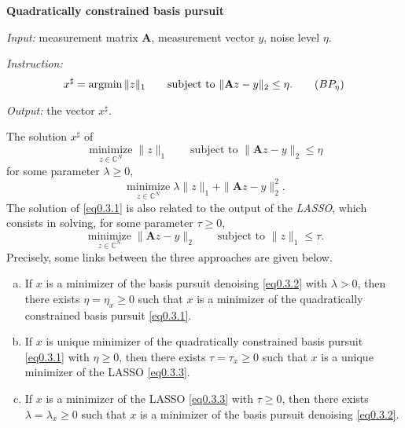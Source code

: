 \begin{mdframed}
    \label{qbp}
    \begin{center}
        \textbf{\textcolor[rgb]{1,0,0}{Quadratically constrained basis pursuit}}
    \end{center}
    \emph{Input:} measurement matrix $\mathbf{A}$, measurement vector $y$, noise level $\eta$.

    \emph{Instruction:}
    \begin{equation}
        x^{\sharp} = \mathop{\mathrm{argmin}} \|z\|_1 \qquad \text{subject to } \|\mathbf{A}z - y\|_2 \leq \eta. \tag{$BP_{\eta}$}
        \label{eqbpn}
    \end{equation}

    \emph{Output:} the vector  $x^{\sharp}$.
\end{mdframed}
    The solution $x^{\sharp}$ of 
    \begin{equation}
        \mathop{\mathrm{minimize}}\limits_{z \in \mathbb{C}^{N}}\|z\|_1 \qquad \text{subject to }\|\mathbf{A}z - y\|_2 \leq \eta
        \label{eq0.3.1}
    \end{equation}
    for some parameter $\lambda \geq 0$,
    \begin{equation}
        \mathop{\mathrm{minimize}}\limits_{z \in \mathbb{C}^N} \lambda\|z\|_1 + \|\mathbf{A}z - y\|_2^2.
        \label{eq0.3.2}
    \end{equation}
    The solution of \cref{eq0.3.1} is also related to the output of the \emph{LASSO}, which consists in solving, for some parameter $\tau \geq 0$,
    \begin{equation}
        \mathop{\mathrm{minimize}}\limits_{z \in \mathbb{C}^N} \|\mathbf{A}z - y\|_2 \qquad \text{subject to }\|z\|_1 \leq \tau.
        \label{eq0.3.3}
    \end{equation}
    Precisely, some links between the three approaches are given below.


\begin{proposition}
    \label{pr0.3.2}
    \begin{enumerate}[(a)]
        \item If $x$ is a minimizer of the basis pursuit denoising \cref{eq0.3.2} with $\lambda > 0$, then there exists $\eta = \eta_x \geq 0$ such that $x$ is a minimizer of the quadratically constrained basis pursuit \cref{eq0.3.1}.
        \item If $x$ is unique minimizer of the quadratically constrained basis pursuit \cref{eq0.3.1} with $\eta \geq 0$, then there exists $\tau = \tau_x \geq 0$ such that $x$ is a unique minimizer of the LASSO \cref{eq0.3.3}.
        \item If $x$ is a minimizer of the LASSO \cref{eq0.3.3} with $\tau \geq 0$, then there exists $\lambda = \lambda_x \geq 0$ such that $x$ is a minimizer of the basis pursuit denoising \cref{eq0.3.2}.
    \end{enumerate}
\end{proposition}

